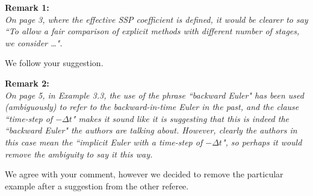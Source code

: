 \documentclass[12pt]{article}
\newcommand{\remark}[2]{\vspace{25pt} \noindent \textbf{Remark #1:\newline} \textit{#2}\vspace{15pt}}
\renewcommand{\newline}{\vspace{15pt}\\}
\begin{document}
\remark{1}{
On page 3, where the effective SSP coefficient is defined, it would be clearer to say
``To allow a fair comparison of explicit methods with different number of stages, we consider \dots". }

We follow your suggestion.

\remark{2}{
On page 5, in Example 3.3, the use of the phrase ``backward Euler" has been used 
(ambiguously) to refer to the backward-in-time Euler in the past, and the clause 
``time-step of $-\Delta t$" makes it sound like it is suggesting that this is indeed 
the ``backward Euler" the authors are talking about. 
However, clearly the authors in this case mean the ``implicit Euler with a time-step 
of $-\Delta t$", so perhaps it would remove the ambiguity to say it this way.}

We agree with your comment, however we decided to remove the particular example 
after a suggestion from the other referee.
\end{document}
